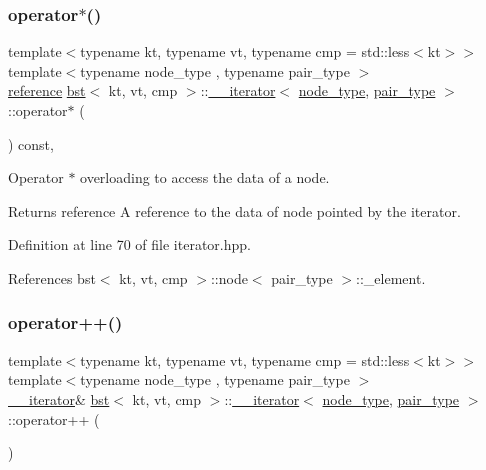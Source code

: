 \subsubsection{\texorpdfstring{operator$\ast$()}{operator*()}}
{\footnotesize\ttfamily template$<$typename kt, typename vt, typename cmp = std\+::less$<$kt$>$$>$ \\
template$<$typename node\+\_\+type , typename pair\+\_\+type $>$ \\
\hyperlink{classbst_1_1____iterator_a3189983e4edb73a8ce449b290ceb97d1}{reference} \hyperlink{classbst}{bst}$<$ kt, vt, cmp $>$\+::\hyperlink{classbst_1_1____iterator}{\+\_\+\+\_\+iterator}$<$ \hyperlink{classbst_a062eb2a1ac54802dbc4f0f74ae2afd01}{node\+\_\+type}, \hyperlink{classbst_a7b11cca2a3b4394915600194f741ab16}{pair\+\_\+type} $>$\+::operator$\ast$ (\begin{DoxyParamCaption}{ }\end{DoxyParamCaption}) const\hspace{0.3cm}{\ttfamily [inline]}, {\ttfamily [noexcept]}}



Operator $\ast$ overloading to access the data of a node. 

\begin{DoxyReturn}{Returns}
reference A reference to the data of node pointed by the iterator. 
\end{DoxyReturn}


Definition at line 70 of file iterator.\+hpp.



References bst$<$ kt, vt, cmp $>$\+::node$<$ pair\+\_\+type $>$\+::\+\_\+element.

\mbox{\label{classbst_1_1____iterator_a0551167f26a1769faa27afd7018eeb03}} 
\subsubsection{\texorpdfstring{operator++()}{operator++()}\hspace{0.1cm}{\footnotesize\ttfamily [1/2]}}
{\footnotesize\ttfamily template$<$typename kt, typename vt, typename cmp = std\+::less$<$kt$>$$>$ \\
template$<$typename node\+\_\+type , typename pair\+\_\+type $>$ \\
\hyperlink{classbst_1_1____iterator}{\+\_\+\+\_\+iterator}\& \hyperlink{classbst}{bst}$<$ kt, vt, cmp $>$\+::\hyperlink{classbst_1_1____iterator}{\+\_\+\+\_\+iterator}$<$ \hyperlink{classbst_a062eb2a1ac54802dbc4f0f74ae2afd01}{node\+\_\+type}, \hyperlink{classbst_a7b11cca2a3b4394915600194f741ab16}{pair\+\_\+type} $>$\+::operator++ (\begin{DoxyParamCaption}{ }\end{DoxyParamCaption})\hspace{0.3cm}{\ttfamily [inline]}}



